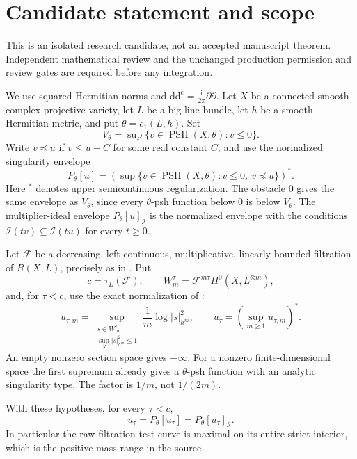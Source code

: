 \section{Candidate statement and scope}
\label{sec:p147-candidate-scope}

This is an isolated research candidate, not an accepted manuscript theorem.
Independent mathematical review and the unchanged production permission and
review gates are required before any integration.

We use squared Hermitian norms and
\(\mathrm d\mathrm d^{\mathrm c}
 =\frac{\mathrm i}{2\pi}\partial\bar\partial\).
Let \(X\) be a connected smooth complex projective variety, let \(L\) be a
big line bundle, let \(h\) be a smooth Hermitian metric, and put
\(\theta=c_1(L,h)\).  Set
\[
 V_\theta=\sup\{v\in\operatorname{PSH}(X,\theta):v\leq0\}.
\]
Write \(v\preceq u\) if \(v\leq u+C\) for some real constant \(C\), and use
the normalized singularity envelope
\[
 P_\theta[u]
 =\left(\sup\{v\in\operatorname{PSH}(X,\theta):
                  v\leq0,\ v\preceq u\}\right)^*.
\]
Here \({}^*\) denotes upper semicontinuous regularization.  The obstacle
\(0\) gives the same envelope as \(V_\theta\), since every
\(\theta\)-psh function below \(0\) is below \(V_\theta\).
The multiplier-ideal envelope \(P_\theta[u]_{\mathcal I}\) is the
normalized envelope with the conditions
\(\mathcal I(tv)\subseteq\mathcal I(tu)\) for every \(t\geq0\).

Let \(\mathcal F\) be a decreasing, left-continuous, multiplicative,
linearly bounded filtration of \(R(X,L)\), precisely as in
\cite[Definition~4.1]{DXZ23}.  Put
\[
 c=\tau_L(\mathcal F),\qquad
 W_m^\tau=\mathcal F^{m\tau}H^0(X,L^{\otimes m}),
\]
and, for \(\tau<c\), use the exact normalization of
\cite[Definition~4.3]{DXZ23}:
\begin{equation}\label{eq:p147-raw-definition}
 u_{\tau,m}
 =\sup_{\substack{s\in W_m^\tau\\
             \sup_X|s|_{h^m}^2\leq1}}
       \frac1m\log|s|_{h^m}^2,\qquad
 u_\tau=\left(\sup_{m\geq1}u_{\tau,m}\right)^*.
\end{equation}
An empty nonzero section space gives \(-\infty\).
For a nonzero finite-dimensional space the first supremum already gives
a \(\theta\)-psh function with an analytic singularity type.
The factor is \(1/m\), not \(1/(2m)\).

\begin{theorem}\label{thm:p147-filtration-maximality-candidate}
With these hypotheses, for every \(\tau<c\),
\begin{equation}\label{eq:p147-target}
 u_\tau=P_\theta[u_\tau]=P_\theta[u_\tau]_{\mathcal I}.
\end{equation}
In particular the raw filtration test curve is maximal on its entire
strict interior, which is the positive-mass range in the source.
\end{theorem}

